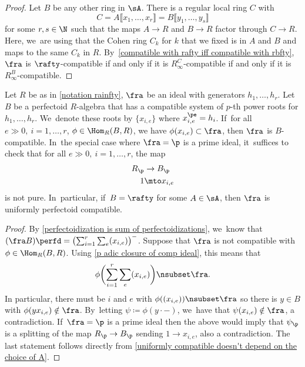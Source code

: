\begin{proof}
Let $B$ be any other ring in $\sA$.
There is a regular local ring $C$ with
\[
C=A\llbracket x_1,\ldots,x_r\rrbracket = B\llbracket y_1,\ldots,y_s\rrbracket
\]
for some $r, s\in \N$ such that the maps $A\to R$ and $B\to R$ factor through $C\to R$. Here, we~are using that the Cohen ring $C_k$ for $k$ that we fixed is in $A$ and $B$ and maps to the same $C_k$ in $R$. By~\autoref{compatible with rafty iff compatible with rbfty}, $\fra$ is $\rafty$-compatible if and only if it is $R^C_\infty$-compatible if and only if it is $R^B_\infty$-compatible.
\end{proof}

\begin{lemma}\label{not pfd pure p not in P implies compatible}
Let $R$ be as in \autoref{notation rainfty}, $\fra$ be an ideal with generators $h_1,\ldots,h_r$. Let $B$ be a perfectoid $R$\nobreakdash-algebra that has a compatible system of $p$-th power roots for $h_1,\ldots, h_r$. We~denote these roots by $\{x_{i,e}\}$ where $x_{i,e}^\pe=h_i$. If~for all $e\gg 0, \ i=1,\ldots,r$, $\phi\in \Hom_R(B,R)$, we have $\phi(x_{i,e})\subset \fra$, then $\fra$ is $B$-compatible. In~the special case where $\fra=\p$ is a prime ideal, it~suffices to check that for all $e\gg 0, \ i=1,\ldots,r$, the map
\begin{equation}\label{map to loc of rafty at p}
\begin{aligned}
R_\p &\to B_\p\\
1 &\mto x_{i,e}
\end{aligned}
\end{equation}
is not pure. In~particular, if~$B=\rafty$ for some $A\in \sA$, then $\fra$ is uniformly perfectoid compatible.
\end{lemma}

\begin{proof}
By \autoref{perfectoidization is sum of perfectoidizations}, we~know that $(\fra B)\perfd=\bigl(\sum_{i=1}^r \sum_e (x_{i,e})\bigr)^{-}$. Suppose that $\fra$ is not compatible with $\phi\in \Hom_R(B,R)$. Using \autoref{p adic closure of comp ideal}, this means that
\[
\phi\biggl(\sum_{i=1}^r \sum_e (x_{i,e}) \biggr)\nsubset \fra.
\]
In particular, there must be $i$ and $e$ with $\phi( (x_{i,e}))\nsubset \fra$ so there is $y\in B$ with $\phi( yx_{i,e})\notin \fra$. By~letting $\psi\coloneqq \phi(y\cdot -)$, we~have that $\psi(x_{i,e})\notin \fra$, a contradiction. If~$\fra=\p$ is a prime ideal then the above would imply that $\psi_\p$ is a splitting of the map $R_\p\to B_\p$ sending $1\to x_{i,e}$, also a contradiction. The last statement follows directly from \autoref{uniformly compatible doesn't depend on the choice of A}.
\end{proof}

